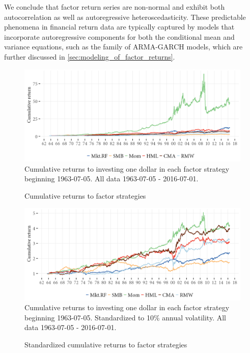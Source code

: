 We conclude that factor return series are non-normal and exhibit both autocorrelation as well as autoregressive heteroscedasticity. These predictable phenomena in financial return data are typically captured by models that incorporate autoregressive components for both the conditional mean and variance equations, such as the family of ARMA-GARCH models, which are further discussed in \autoref{sec:modeling_of_factor_returns}.
\begin{figure}[htbp]
  \caption{Cumulative returns to factor strategies}
  \label{fig:cumret}
  \centering
  \begin{minipage}{\textwidth}
  \includegraphics[scale=1]{graphics/cumretPlot.png}  
  \vspace{3mm}
  \footnotesize
  Cumulative returns to investing one dollar in each factor strategy beginning 1963-07-05.  All data 1963-07-05 - 2016-07-01.
  \end{minipage}
\end{figure}
\begin{figure}[htbp]
  \caption{Standardized cumulative returns to factor strategies}
  \label{fig:cumretstd}
  \centering
  \begin{minipage}{\textwidth}
  \includegraphics[scale=1]{graphics/cumretStdPlot.png}  
  \vspace{3mm}
  \footnotesize
  Cumulative returns to investing one dollar in each factor strategy beginning 1963-07-05. Standardized to 10\% annual volatility. All data 1963-07-05 - 2016-07-01.
  \end{minipage}
\end{figure}


